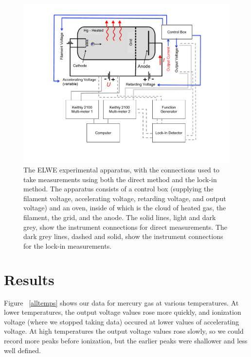 \documentclass[prb,preprint]{revtex4-1}
\begin{document}
\begin{figure}[h!]
\centering
\includegraphics[width=5in]{set-up.pdf} %
\caption{The ELWE experimental apparatus, with the connections used to take measurements using both the direct method and the lock-in method. The apparatus consists of a control box (supplying the filament voltage, accelerating voltage, retarding voltage, and output voltage) and an oven, inside of which is the cloud of heated gas, the filament, the grid, and the anode. The solid lines, light and dark grey, show the instrument connections for direct measurements. The dark grey lines, dashed and solid, show the instrument connections for the lock-in measurements. }
\label{set-up}
\end{figure}

\section{Results}

Figure ~\ref{alltemps} shows our data for mercury gas at various temperatures. 
At lower temperatures, the output voltage values rose more quickly, and ionization voltage (where we stopped taking data) occured at lower values of accelerating voltage. 
At high temperatures the output voltage values rose slowly, so we could record more peaks before ionization, but the earlier peaks were shallower and less well defined. 
\end{document}
